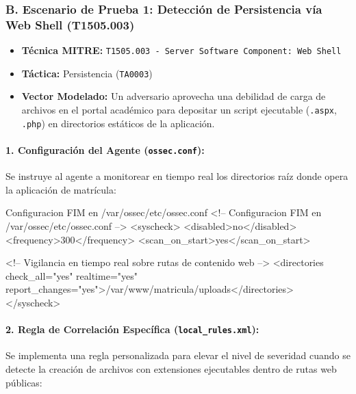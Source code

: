 \subsubsection*{B. Escenario de Prueba 1: Detección de Persistencia vía Web Shell (T1505.003)}

\begin{itemize}
    \item \textbf{Técnica MITRE:} \texttt{T1505.003 - Server Software Component: Web Shell}
    \item \textbf{Táctica:} Persistencia (\texttt{TA0003})
    \item \textbf{Vector Modelado:} Un adversario aprovecha una debilidad de carga de archivos en el portal académico para depositar un script ejecutable (\texttt{.aspx}, \texttt{.php}) en directorios estáticos de la aplicación.
\end{itemize}

\paragraph{1. Configuración del Agente (\texttt{ossec.conf}):}
Se instruye al agente a monitorear en tiempo real los directorios raíz donde opera la aplicación de matrícula:

\begin{cmdbox}{Configuracion FIM en /var/ossec/etc/ossec.conf}
<!-- Configuracion FIM en /var/ossec/etc/ossec.conf -->
<syscheck>
  <disabled>no</disabled>
  <frequency>300</frequency>
  <scan_on_start>yes</scan_on_start>
  
  <!-- Vigilancia en tiempo real sobre rutas de contenido web -->
  <directories check_all="yes" realtime="yes" report_changes="yes">/var/www/matricula/uploads</directories>
</syscheck>
\end{cmdbox}

\paragraph{2. Regla de Correlación Específica (\texttt{local\_rules.xml}):}
Se implementa una regla personalizada para elevar el nivel de severidad cuando se detecte la creación de archivos con extensiones ejecutables dentro de rutas web públicas:


